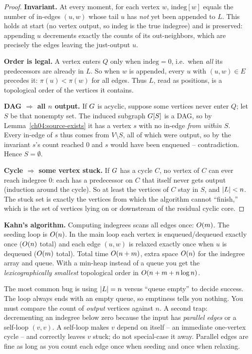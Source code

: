 \begin{proof}
\textbf{Invariant.} At every moment, for each vertex $w$, $\mathrm{indeg}[w]$ equals the number of
in-edges $(u,w)$ whose tail $u$ has \emph{not} yet been appended to $L$. This holds at start (no
vertex output, so $\mathrm{indeg}$ is the true indegree) and is preserved: appending $u$ decrements
exactly the counts of its out-neighbors, which are precisely the edges leaving the just-output $u$.

\textbf{Order is legal.} A vertex enters $Q$ only when $\mathrm{indeg}=0$, i.e.\ when \emph{all} its
predecessors are already in $L$. So when $w$ is appended, every $u$ with $(u,w)\in E$ precedes it:
$\pi(u)<\pi(w)$ for all edges. Thus $L$, read as positions, is a topological order of the vertices it
contains.

\textbf{DAG $\Rightarrow$ all $n$ output.} If $G$ is acyclic, suppose some vertices never enter
$Q$; let $S$ be that nonempty set. The induced subgraph $G[S]$ is a DAG, so by
Lemma~\ref{ch04:source-exists} it has a vertex $s$ with no in-edge \emph{from within $S$}. Every in-edge
of $s$ thus comes from $V\setminus S$, all of which were output, so by the invariant $s$'s count
reached $0$ and $s$ would have been enqueued -- contradiction. Hence $S=\emptyset$.

\textbf{Cycle $\Rightarrow$ some vertex stuck.} If $G$ has a cycle $C$, no vertex of $C$ can ever
reach indegree $0$: each has a predecessor on $C$ that itself never gets output (induction around the
cycle). So at least the vertices of $C$ stay in $S$, and $\lvert L\rvert<n$. The stuck set is exactly the
vertices from which the algorithm cannot ``finish,'' which is the set of vertices lying on or
downstream of the residual cyclic core.
\end{proof}

\begin{complexitybox}
\textbf{Kahn's algorithm.} Computing indegrees scans all edges once: $O(m)$. The seeding loop is
$O(n)$. In the main loop each vertex is enqueued/dequeued exactly once ($O(n)$ total) and each
edge $(u,w)$ is relaxed exactly once when $u$ is dequeued ($O(m)$ total). Total time
$O(n+m)$, extra space $O(n)$ for the indegree array and queue. With a min-heap instead of a queue
you get the \emph{lexicographically smallest} topological order in $O(n+m+ n\log n)$.
\end{complexitybox}

\begin{trapbox}
The most common bug is using $\lvert L\rvert=n$ versus ``queue empty'' to decide success. The loop always
ends with an empty queue, so emptiness tells you nothing. You must compare the count of \emph{output}
vertices against $n$. A second trap: decrementing an indegree below zero because the input has
\emph{parallel edges} or a self-loop $(v,v)$. A self-loop makes $v$ depend on itself -- an
immediate one-vertex cycle -- and correctly leaves $v$ stuck; do not special-case it away. Parallel
edges are fine as long as you count each edge once when seeding and once when relaxing.
\end{trapbox}

